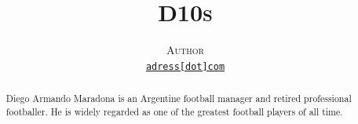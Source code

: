 \documentclass[oneside]{article}
\title{\vspace{-15mm}\fontsize{24pt}{10pt}\selectfont\textsf{\bfseries{\textsc{D10s}}}} %
\author{
\large
\textsc{Author}\\
\small \href{mailto:enter_adress_here}{\texttt{adress[dot]com}} 
}
\date{}
\begin{document}
\maketitle %
\tableofcontents
\thispagestyle{empty} 


\begin{abstract}



\noindent Diego Armando Maradona is an Argentine football manager and retired professional footballer. He is widely regarded as one of the greatest football players of all time. 

\vspace*{4mm}
\end{abstract}




\end{document}

